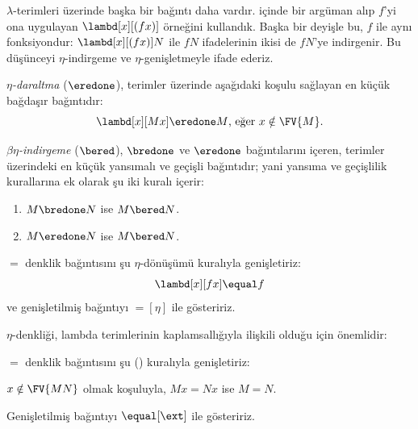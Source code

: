 


$\lambda$-terimleri üzerinde başka bir bağıntı daha vardır. 
içinde bir argüman alıp $f$'yi ona uygulayan $\lambd[x][(fx)]$ örneğini
kullandık. Başka bir deyişle bu, $f$ ile aynı fonksiyondur:
$\lambd[x][(fx)]N$ ile $fN$ ifadelerinin ikisi de $fN$'ye indirgenir. Bu
düşünceyi $\eta$-indirgeme ve $\eta$-genişletmeyle ifade ederiz.

\begin{defn}
  \emph{$\eta$-daraltma} ($\eredone$), terimler üzerinde aşağıdaki koşulu
  sağlayan en küçük bağdaşır bağıntıdır:
  \[
    \lambd[x][M x] \eredone M \text{, eğer } x \notin \FV{M}.
  \]
\end{defn}

\begin{defn} 
  \emph{$\beta\eta$-indirgeme} ($\bered$), $\bredone$ ve $\eredone$
  bağıntılarını içeren, terimler üzerindeki en küçük yansımalı ve geçişli
  bağıntıdır; yani yansıma ve geçişlilik kurallarına ek olarak şu iki kuralı
  içerir:
  \begin{enumerate}
  \item $M \bredone N$ ise $M \bered N$. 
  \item $M \eredone N$ ise $M \bered N$. 
  \end{enumerate}

\end{defn}

\begin{defn}
  $\equal$ denklik bağıntısını şu $\eta$-dönüşümü kuralıyla genişletiriz:
  \[
  \lambd[x][f x] \equal f
  \]
  ve genişletilmiş bağıntıyı $\equal[\eta]$ ile gösteririz.
\end{defn}

$\eta$-denkliği, lambda terimlerinin kaplamsallığıyla ilişkili olduğu için
önemlidir:

\begin{defn}[Kaplamsallık]
  $\equal$ denklik bağıntısını şu (\ext) kuralıyla genişletiriz:
  \begin{center}
  $x \notin \FV{MN}$ olmak koşuluyla, $Mx \equal Nx$ ise $M \equal N$.
  \end{center}
  Genişletilmiş bağıntıyı $\equal[\ext]$ ile gösteririz.
\end{defn}

